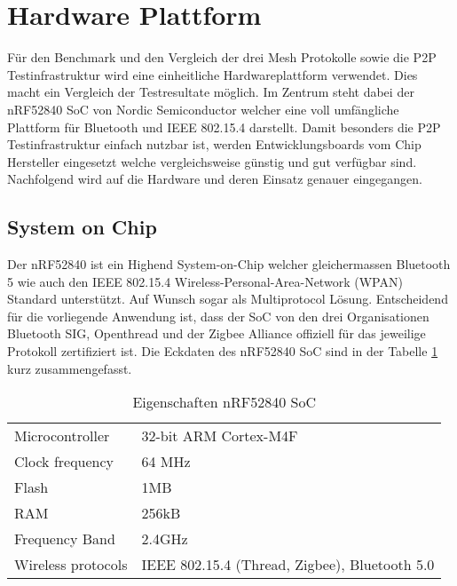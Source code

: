 \clearpage
\section{Hardware Plattform}\label{sec:HardwarePlattform}


Für den Benchmark und den Vergleich der drei Mesh Protokolle sowie die P2P Testinfrastruktur wird eine einheitliche Hardwareplattform verwendet. Dies macht ein Vergleich der Testresultate möglich. Im Zentrum steht dabei der nRF52840 SoC von Nordic Semiconductor welcher eine voll umfängliche Plattform für Bluetooth und IEEE 802.15.4 darstellt. Damit besonders die P2P Testinfrastruktur einfach nutzbar ist, werden Entwicklungsboards vom Chip Hersteller eingesetzt welche vergleichsweise günstig und gut verfügbar sind. Nachfolgend wird auf die Hardware und deren Einsatz genauer eingegangen.


\subsection{System on Chip}\label{subsec:SystemonChip}

Der nRF52840 ist ein Highend System-on-Chip welcher gleichermassen Bluetooth 5 wie auch den IEEE 802.15.4 Wireless-Personal-Area-Network (WPAN) Standard unterstützt. Auf Wunsch sogar als Multiprotocol Lösung.
Entscheidend für die vorliegende Anwendung ist, dass der SoC von den drei Organisationen Bluetooth SIG, Openthread und der Zigbee Alliance offiziell für das jeweilige Protokoll zertifiziert ist.
Die Eckdaten des nRF52840 SoC sind in der Tabelle \ref{tab:EigenschaftennRF52840SoC} kurz zusammengefasst.

\begin{table}[h]
\centering
\begin{tabular}{ll}
\toprule
Microcontroller    & 32-bit ARM Cortex-M4F                        \\
Clock frequency    & 64 MHz                                       \\
Flash              & 1MB                                        \\
RAM                & 256kB                                          \\
Frequency Band     & 2.4GHz                                       \\
Wireless protocols & IEEE 802.15.4 (Thread, Zigbee), Bluetooth 5.0  \\
\bottomrule
\end{tabular}
\caption{Eigenschaften nRF52840 SoC \cite{nordic_semiconductor_asa_nrf52840_2020}}
\label{tab:EigenschaftennRF52840SoC}
\end{table}


